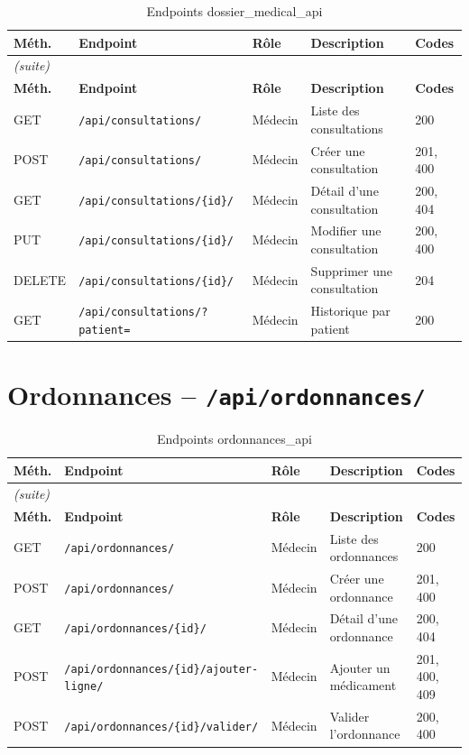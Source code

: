 \documentclass[12pt,a4paper]{report}
\begin{document}
\begin{longtable}{|p{1.5cm}|p{5cm}|p{2.5cm}|p{3cm}|p{1.5cm}|}
  \caption{Endpoints dossier\_medical\_api} \\
  \hline
  \rowcolor{medaccent}
  \textbf{Méth.} & \textbf{Endpoint} & \textbf{Rôle} & \textbf{Description} & \textbf{Codes} \\
  \hline
  \endfirsthead
  \multicolumn{5}{l}{\small\textit{(suite)}} \\
  \hline
  \rowcolor{medaccent}
  \textbf{Méth.} & \textbf{Endpoint} & \textbf{Rôle} & \textbf{Description} & \textbf{Codes} \\
  \hline
  \endhead
  \hline
  \endfoot
  GET & \texttt{/api/consultations/} & Médecin & Liste des consultations & 200 \\
  \hline
  POST & \texttt{/api/consultations/} & Médecin & Créer une consultation & 201, 400 \\
  \hline
  GET & \texttt{/api/consultations/\{id\}/} & Médecin & Détail d'une consultation & 200, 404 \\
  \hline
  PUT & \texttt{/api/consultations/\{id\}/} & Médecin & Modifier une consultation & 200, 400 \\
  \hline
  DELETE & \texttt{/api/consultations/\{id\}/} & Médecin & Supprimer une consultation & 204 \\
  \hline
  GET & \texttt{/api/consultations/?patient=} & Médecin & Historique par patient & 200 \\
  \hline
\end{longtable}

\section{Ordonnances -- \texttt{/api/ordonnances/}}

\begin{longtable}{|p{1.5cm}|p{5.5cm}|p{2cm}|p{3cm}|p{1.5cm}|}
  \caption{Endpoints ordonnances\_api} \\
  \hline
  \rowcolor{medaccent}
  \textbf{Méth.} & \textbf{Endpoint} & \textbf{Rôle} & \textbf{Description} & \textbf{Codes} \\
  \hline
  \endfirsthead
  \multicolumn{5}{l}{\small\textit{(suite)}} \\
  \hline
  \rowcolor{medaccent}
  \textbf{Méth.} & \textbf{Endpoint} & \textbf{Rôle} & \textbf{Description} & \textbf{Codes} \\
  \hline
  \endhead
  \hline
  \endfoot
  GET & \texttt{/api/ordonnances/} & Médecin & Liste des ordonnances & 200 \\
  \hline
  POST & \texttt{/api/ordonnances/} & Médecin & Créer une ordonnance & 201, 400 \\
  \hline
  GET & \texttt{/api/ordonnances/\{id\}/} & Médecin & Détail d'une ordonnance & 200, 404 \\
  \hline
  POST & \texttt{/api/ordonnances/\{id\}/ajouter-ligne/} & Médecin & Ajouter un médicament & 201, 400, 409 \\
  \hline
  POST & \texttt{/api/ordonnances/\{id\}/valider/} & Médecin & Valider l'ordonnance & 200, 400 \\
  \hline
\end{longtable}
\end{document}
